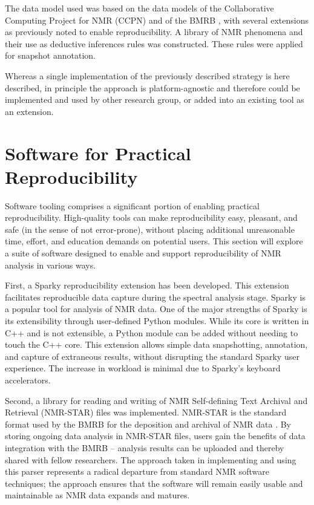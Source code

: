 The data model used was based on the data models of the 
Collaborative Computing Project for NMR (CCPN) \cite{ccpn}
and of the BMRB \cite{bmrb}, with several 
extensions as previously noted to enable reproducibility.  A library of NMR 
phenomena and their use as deductive inferences rules was constructed.  
These rules were applied for snapshot annotation.

Whereas a single implementation of the previously described strategy is 
here described, in principle the approach is platform-agnostic and 
therefore could be implemented and used by other research group, or added 
into an existing tool as an extension.


\section{Software for Practical Reproducibility}
Software tooling comprises a significant portion of enabling practical 
reproducibility.  High-quality tools can make reproducibility easy, pleasant, 
and safe (in the sense of not error-prone), without placing additional 
unreasonable time, effort, and education demands on potential users.  This 
section will explore a suite of software designed to enable and support 
reproducibility of NMR analysis in various ways.
	
First, a Sparky reproducibility extension has been developed.  This extension
facilitates reproducible data capture during the spectral analysis stage. Sparky 
\cite{sparky} is a popular tool for analysis of NMR data.  One of the major 
strengths of Sparky is its extensibility through user-defined Python modules.  
While its core is written in C++ and is not extensible, a Python module can 
be added without needing to touch the C++ core.  This extension allows
simple data snapshotting, annotation, and capture of extraneous results,
without disrupting the standard Sparky user experience.  The increase in
workload is minimal due to Sparky's keyboard accelerators.

Second, a library for reading and writing of 
NMR Self-defining Text Archival and Retrieval (NMR-STAR)
files was implemented.  
NMR-STAR is the standard format used by the BMRB for the deposition and 
archival of NMR data \cite{hall1991star, hall1994star, hall1995star}.
By storing ongoing data analysis in NMR-STAR files, 
users gain the benefits of data integration with the BMRB -- analysis results 
can be uploaded and thereby shared with fellow researchers.  The approach 
taken in implementing and using this parser represents a radical departure 
from standard NMR software techniques; the approach ensures that the 
software will remain easily usable and maintainable as NMR data expands 
and matures.

